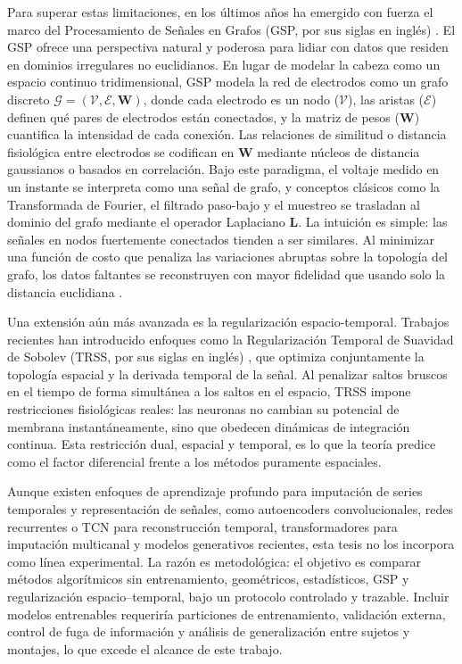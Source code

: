 Para superar estas limitaciones, en los últimos años ha emergido con fuerza el marco del Procesamiento de Señales en Grafos (GSP, por sus siglas en inglés) \cite{shuman2013,ortega2018}. El GSP ofrece una perspectiva natural y poderosa para lidiar con datos que residen en dominios irregulares no euclidianos. En lugar de modelar la cabeza como un espacio continuo tridimensional, GSP modela la red de electrodos como un grafo discreto $\mathcal{G} = (\mathcal{V}, \mathcal{E}, \mathbf{W})$, donde cada electrodo es un nodo ($\mathcal{V}$), las aristas ($\mathcal{E}$) definen qué pares de electrodos están conectados, y la matriz de pesos ($\mathbf{W}$) cuantifica la intensidad de cada conexión. Las relaciones de similitud o distancia fisiológica entre electrodos se codifican en $\mathbf{W}$ mediante núcleos de distancia gaussianos o basados en correlación.
Bajo este paradigma, el voltaje medido en un instante se interpreta como una señal de grafo, y conceptos clásicos como la Transformada de Fourier, el filtrado paso-bajo y el muestreo se trasladan al dominio del grafo mediante el operador Laplaciano $\mathbf{L}$. La intuición es simple: las señales en nodos fuertemente conectados tienden a ser similares. Al minimizar una función de costo que penaliza las variaciones abruptas sobre la topología del grafo, los datos faltantes se reconstruyen con mayor fidelidad que usando solo la distancia euclidiana \cite{narang2013}.

Una extensión aún más avanzada es la regularización espacio-temporal. Trabajos recientes han introducido enfoques como la Regularización Temporal de Suavidad de Sobolev (TRSS, por sus siglas en inglés) \cite{giraldo2022}, que optimiza conjuntamente la topología espacial y la derivada temporal de la señal. Al penalizar saltos bruscos en el tiempo de forma simultánea a los saltos en el espacio, TRSS impone restricciones fisiológicas reales: las neuronas no cambian su potencial de membrana instantáneamente, sino que obedecen dinámicas de integración continua. Esta restricción dual, espacial y temporal, es lo que la teoría predice como el factor diferencial frente a los métodos puramente espaciales.

Aunque existen enfoques de aprendizaje profundo para imputación de series temporales y representación de señales, como autoencoders convolucionales, redes recurrentes o TCN para reconstrucción temporal, transformadores para imputación multicanal y modelos generativos recientes, esta tesis no los incorpora como línea experimental. La razón es metodológica: el objetivo es comparar métodos algorítmicos sin entrenamiento, geométricos, estadísticos, GSP y regularización espacio--temporal, bajo un protocolo controlado y trazable. Incluir modelos entrenables requeriría particiones de entrenamiento, validación externa, control de fuga de información y análisis de generalización entre sujetos y montajes, lo que excede el alcance de este trabajo.
